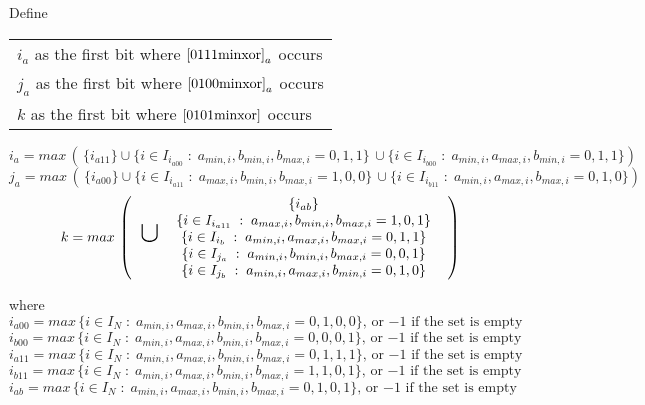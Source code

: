 \documentclass{article}
\begin{document}
Define 
\begin{tabular}{l}
$i_a$ as the first bit where $\eqref{0111minxor}_a$ occurs\\
$j_a$ as the first bit where $\eqref{0100minxor}_a$ occurs\\
$k$ as the first bit where $\eqref{0101minxor}$ occurs
\end{tabular}
\begin{equation*}
i_a = 
max \, ( \, \{i_{a11}\} \cup 
\{i \in I_{i_{a00}}\; : \; a_{min,i},b_{min,i},b_{max,i} = 0,1,1\} \, \cup
\{i \in I_{i_{b00}}\; : \; a_{min,i},a_{max,i},b_{min,i} = 0,1,1\} 
) 
\end{equation*}
\begin{equation*}
j_a = 
max \, ( \, \{i_{a00}\} \cup 
\{i \in I_{i_{a11}}\; : \; a_{max,i},b_{min,i},b_{max,i} = 1,0,0\} \, \cup
\{i \in I_{i_{b11}}\; : \; a_{min,i},a_{max,i},b_{max,i} = 0,1,0\} 
) 
\end{equation*}
\begin{equation*}
k = max \, 
\left(
\begin{tabular}{l c}
\huge $\cup$ \normalsize
\begin{tabular}{c}
$\{i_{ab}\}$\\
$\{i \in I_{i_{a11}}\; : \; a_{max,i},b_{min,i},b_{max,i} = 1,0,1\} $\\
$\{i \in I_{i_{b}}\; : \; a_{min,i},a_{max,i},b_{max,i} = 0,1,1\} $\\
$\{i \in I_{j_{a}}\; : \; a_{min,i},b_{min,i},b_{max,i} = 0,0,1\} $\\
$\{i \in I_{j_{b}}\; : \; a_{min,i},a_{max,i},b_{min,i} = 0,1,0\} $\\
\end{tabular}
\end{tabular}
\right)
\end{equation*}

    where
\begin{equation*}
i_{a00} = max \, \{i \in I_N\; : \; 
a_{min,i}, a_{max,i},b_{min,i},b_{max,i} = 0,1,0,0\},\,
\text{or $-1$ if the set is empty}
\end{equation*}
\begin{equation*}
i_{b00} = max \, \{i \in I_N\; : \; 
a_{min,i}, a_{max,i},b_{min,i},b_{max,i} = 0,0,0,1\},\,
\text{or $-1$ if the set is empty}
\end{equation*}
\begin{equation*}
i_{a11} = max \, \{i \in I_N\; : \; 
a_{min,i}, a_{max,i},b_{min,i},b_{max,i} = 0,1,1,1\},\,
\text{or $-1$ if the set is empty}
\end{equation*}
\begin{equation*}
i_{b11} = max \, \{i \in I_N\; : \; 
a_{min,i}, a_{max,i},b_{min,i},b_{max,i} = 1,1,0,1\},\,
\text{or $-1$ if the set is empty}
\end{equation*}
\begin{equation*}
i_{ab} = max \, \{i \in I_N\; : \; 
a_{min,i}, a_{max,i},b_{min,i},b_{max,i} = 0,1,0,1\},\,
\text{or $-1$ if the set is empty}
\end{equation*}
\end{document}

